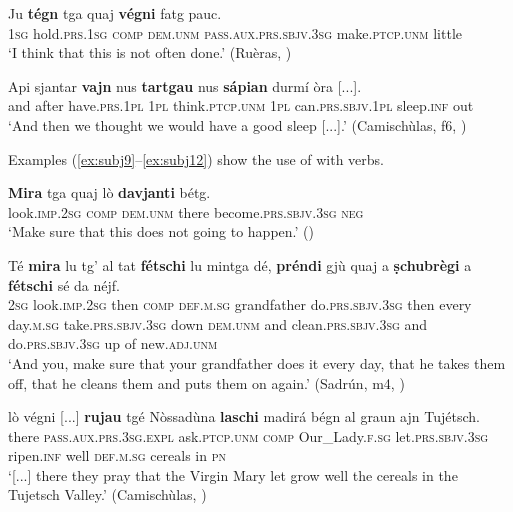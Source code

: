 \ea
\label{ex:subj6}
\gll  Ju \textbf{tégn} tga quaj \textbf{végni} fatg pauc.  \\
\textsc{1sg} hold.\textsc{prs.1sg} \textsc{comp} \textsc{dem.unm} \textsc{pass.aux.prs.sbjv.3sg} make.\textsc{ptcp.unm} little\\
\glt `I think that this is not often done.' (Ruèras, )
\z

\ea
\label{ex:subj8}
\gll    Api sjantar \textbf{vajn} nus \textbf{tartgau} {\longrule} nus \textbf{sápian} durmí òra [...].\\
and after have.\textsc{prs.1pl} \textsc{1pl} think.\textsc{ptcp.unm} {} \textsc{1pl}  can.\textsc{prs.sbjv.1pl} sleep.\textsc{inf} out\\
\glt `And then we thought we would have a good sleep [...].' (Camischùlas, f6, )
\z

Examples (\ref{ex:subj9}--\ref{ex:subj12}) show the use of  with  verbs.

\ea
\label{ex:subj9}
\gll  \textbf{Mira} tga quaj lò \textbf{davjanti} bétg. \\
look.\textsc{imp.2sg} \textsc{comp} \textsc{dem.unm} there become.\textsc{prs.sbjv.3sg} \textsc{neg}\\
\glt `Make sure that this does not going to happen.' ()
\z

\ea
\label{ex:subj10}
\gll  Té \textbf{mira} lu tg’ al tat \textbf{fétschi} lu mintga dé, \textbf{préndi} gjù quaj a \textbf{ṣchubrègi} a \textbf{fétschi} sé da néjf.\\
\textsc{2sg} look.\textsc{imp.2sg} then \textsc{comp} \textsc{def.m.sg} grandfather do.\textsc{prs.sbjv.3sg} then every day.\textsc{m.sg} take.\textsc{prs.sbjv.3sg} down \textsc{dem.unm} and clean.\textsc{prs.sbjv.3sg} and do.\textsc{prs.sbjv.3sg} up of new.\textsc{adj.unm} \\
\glt `And you, make sure that your grandfather does it every day, that he takes them off, that he cleans them and puts them on again.' (Sadrún, m4, )
\z

\ea
\label{ex:subj11}
\gll [...] lò végni [...] \textbf{rujau} tgé Nòssadùna \textbf{laschi} madirá bégn al graun ajn Tujétsch.\\
{} there \textsc{pass.aux.prs.3sg.expl} {} ask.\textsc{ptcp.unm} \textsc{comp} Our\_Lady.\textsc{f.sg} let.\textsc{prs.sbjv.3sg} ripen.\textsc{inf} well \textsc{def.m.sg} cereals in \textsc{pn}\\
\glt `[...] there they pray that the Virgin Mary let grow well the cereals in the Tujetsch Valley.' (Camischùlas, \citealt[94]{Büchli1966})
\z

